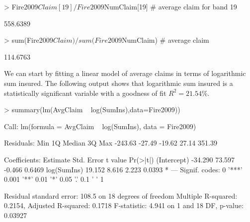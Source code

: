 \documentclass[12pt,letterpaper]{article}
\begin{document}
\begin{Schunk}
\begin{Sinput}
> Fire2009$Claim[19]/Fire2009$NumClaim[19] #  average claim for band 19
\end{Sinput}
\begin{Soutput}
[1] 558.6389
\end{Soutput}
\begin{Sinput}
> sum(Fire2009$Claim)/sum(Fire2009$NumClaim) #  average claim
\end{Sinput}
\begin{Soutput}
[1] 114.6763
\end{Soutput}
\end{Schunk}

We can start by fitting a linear model of average claims in terms of logarithmic sum insured. 
The following output shows that logarithmic sum insured is a statistically significant variable 
with a goodness of fit $R^2 = 21.54\%.$

\begin{Schunk}
\begin{Sinput}
> summary(lm(AvgClaim ~ log(SumIns),data=Fire2009)) 
\end{Sinput}
\begin{Soutput}
Call:
lm(formula = AvgClaim ~ log(SumIns), data = Fire2009)

Residuals:
    Min      1Q  Median      3Q     Max 
-243.63  -27.49  -19.62   27.14  351.39 

Coefficients:
            Estimate Std. Error t value Pr(>|t|)  
(Intercept)  -34.290     73.597  -0.466   0.6469  
log(SumIns)   19.152      8.616   2.223   0.0393 *
---
Signif. codes:  0 '***' 0.001 '**' 0.01 '*' 0.05 '.' 0.1 ' ' 1

Residual standard error: 108.5 on 18 degrees of freedom
Multiple R-squared:  0.2154,	Adjusted R-squared:  0.1718 
F-statistic: 4.941 on 1 and 18 DF,  p-value: 0.03927
\end{Soutput}
\end{Schunk}
\end{document}
